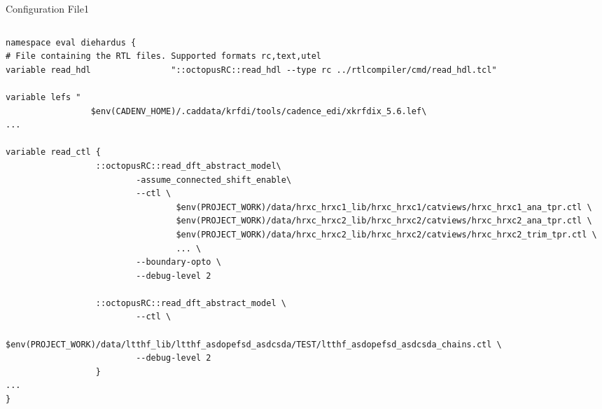 \documentclass{beamer}
\begin{document}
\begin{frame}{Configuration File}{1}
\begin{columns}
\begin{column}{1.1\textwidth}
\tiny
\begin{verbatim}
namespace eval diehardus {
# File containing the RTL files. Supported formats rc,text,utel
variable read_hdl                "::octopusRC::read_hdl --type rc ../rtlcompiler/cmd/read_hdl.tcl"

variable lefs "
                 $env(CADENV_HOME)/.caddata/krfdi/tools/cadence_edi/xkrfdix_5.6.lef\
...

variable read_ctl {
                  ::octopusRC::read_dft_abstract_model\
                          -assume_connected_shift_enable\
                          --ctl \
                                  $env(PROJECT_WORK)/data/hrxc_hrxc1_lib/hrxc_hrxc1/catviews/hrxc_hrxc1_ana_tpr.ctl \
                                  $env(PROJECT_WORK)/data/hrxc_hrxc2_lib/hrxc_hrxc2/catviews/hrxc_hrxc2_ana_tpr.ctl \
                                  $env(PROJECT_WORK)/data/hrxc_hrxc2_lib/hrxc_hrxc2/catviews/hrxc_hrxc2_trim_tpr.ctl \
                                  ... \
                          --boundary-opto \
                          --debug-level 2

                  ::octopusRC::read_dft_abstract_model \
                          --ctl \
                                  $env(PROJECT_WORK)/data/ltthf_lib/ltthf_asdopefsd_asdcsda/TEST/ltthf_asdopefsd_asdcsda_chains.ctl \
                          --debug-level 2
                  }
...
}
\end{verbatim}
\end{column}
\end{columns}
\end{frame}
\end{document}
